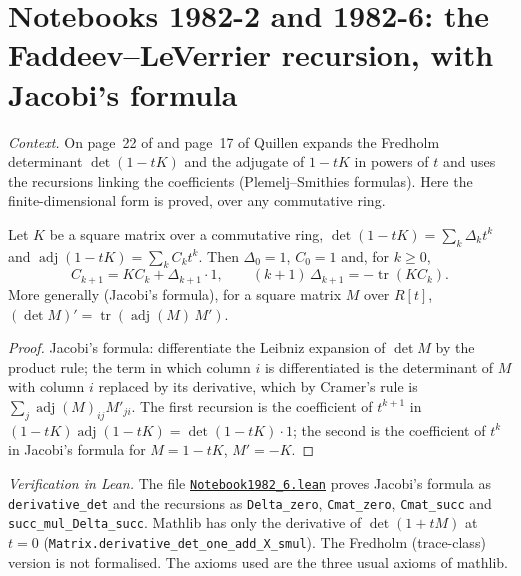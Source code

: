 \section[Notebooks 1982-2 and 1982-6: the Faddeev--LeVerrier recursion]{Notebooks 1982-2 and 1982-6: the Faddeev--LeVerrier recursion, with Jacobi's formula\protect{}}\label{sec:quillen-1982-6}

\emph{Context.} On page~22 of  and page~17 of  Quillen expands the Fredholm determinant $\det(1 - tK)$ and the adjugate of $1 - tK$ in powers of $t$ and uses the recursions linking the coefficients (Plemelj--Smithies formulas). Here the finite-dimensional form is proved, over any commutative ring.

\begin{encadre}
\begin{theoreme}\label{thm:quillen-1982-6}
Let $K$ be a square matrix over a commutative ring, $\det(1 - tK) = \sum_k \Delta_k t^k$ and $\operatorname{adj}(1 - tK) = \sum_k C_kt^k$. Then $\Delta_0 = 1$, $C_0 = 1$ and, for $k \ge 0$,
\[
C_{k+1} = KC_k + \Delta_{k+1}\cdot 1, \qquad (k + 1)\,\Delta_{k+1} = -\operatorname{tr}(KC_k).
\]
More generally (Jacobi's formula), for a square matrix $M$ over $R[t]$, $(\det M)' = \operatorname{tr}(\operatorname{adj}(M)\,M')$.
\end{theoreme}
\end{encadre}

\begin{proof}
Jacobi's formula: differentiate the Leibniz expansion of $\det M$ by the product rule; the term in which column $i$ is differentiated is the determinant of $M$ with column $i$ replaced by its derivative, which by Cramer's rule is $\sum_j \operatorname{adj}(M)_{ij} M'_{ji}$. The first recursion is the coefficient of $t^{k+1}$ in $(1 - tK)\operatorname{adj}(1 - tK) = \det(1 - tK)\cdot 1$; the second is the coefficient of $t^k$ in Jacobi's formula for $M = 1 - tK$, $M' = -K$.
\end{proof}

\emph{Verification in Lean.} The file \href{\leanblobmain/Notebook1982_6.lean}{\texttt{Notebook1982\_6.\allowbreak{}lean}} proves Jacobi's formula as \texttt{derivative\_det} and the recursions as \texttt{Delta\_zero}, \texttt{Cmat\_zero}, \texttt{Cmat\_succ} and \texttt{succ\_mul\_Delta\_succ}. Mathlib has only the derivative of $\det(1 + tM)$ at $t = 0$ (\texttt{Matrix.derivative\_det\_one\_add\_X\_smul}). The Fredholm (trace-class) version is not formalised. The axioms used are the three usual axioms of mathlib.

